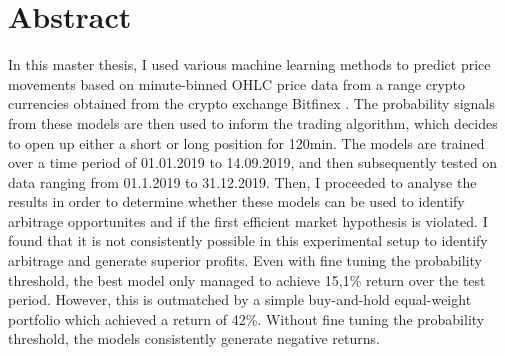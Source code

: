 \section*{Abstract}
\thispagestyle{empty}
In this master thesis, I used various machine learning methods to predict price movements based on minute-binned OHLC price data
from a range crypto currencies obtained from the crypto exchange Bitfinex \cite{bitfinex2012}. 
The probability signals from these models are then used to inform the trading algorithm, 
which decides to open up either a short or long position for 120min. The models are trained over a time period of 01.01.2019 to 14.09.2019, 
and then subsequently tested on data ranging from 01.1.2019 to 31.12.2019.
Then, I proceeded to analyse the results in order to determine whether these models can be used to identify arbitrage opportunites
and if the first efficient market hypothesis is violated. 
I found that it is not consistently possible in this experimental setup to identify arbitrage and generate superior profits.
Even with fine tuning the probability threshold, the best model only managed to achieve 15,1\% return over the test period.
However, this is outmatched by a simple buy-and-hold equal-weight portfolio which achieved a return of 42\%.
Without fine tuning the probability threshold, the models consistently generate negative returns.
